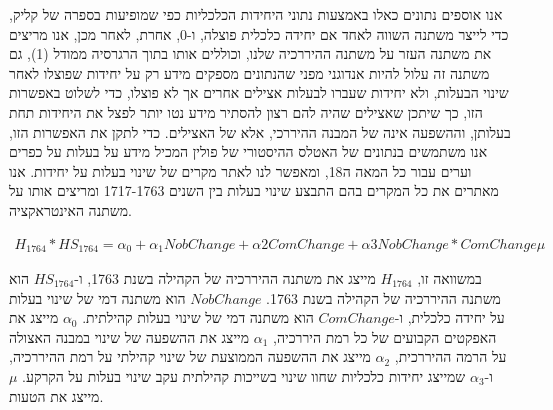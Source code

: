 אנו אוספים נתונים כאלו באמצעות נתוני היחידות הכלכליות כפי שמופיעות בספרה של קליק, כדי לייצר משתנה השווה לאחד אם יחידה כלכלית פוצלה, ו-0, אחרת, לאחר מכן, אנו מריצים את משתנה העזר על משתנה ההיררכיה שלנו, וכוללים אותו בתוך הרגרסיה ממודל (1), גם משתנה זה עלול להיות אנדוגני מפני שהנתונים מספקים מידע רק על יחידות שפוצלו לאחר שינוי הבעלות, ולא יחידות שעברו לבעלות אצילים אחרים אך לא פוצלו, כדי לשלוט באפשרות הזו, כך שיתכן שאצילים שהיה להם רצון להסתיר מידע נטו יותר לפצל את היחידות תחת בעלותן, וההשפעה אינה של המבנה ההיררכי, אלא של האצילים. כדי לתקן את האפשרות הזו, אנו משתמשים בנתונים של האטלס ההיסטורי של פולין המכיל מידע על בעלות על כפרים וערים עבור כל המאה ה18, ומאפשר לנו לאתר מקרים של שינוי בעלות על יחידות. אנו מאתרים את כל המקרים בהם התבצע שינוי בעלות בין השנים 1717-1763 ומריצים אותו על משתנה האינטראקציה.

\begin{align}
H_{1764}*HS_{1764}= \alpha_0 + \alpha_1 NobChange +\alpha2 ComChange +\alpha3 NobChange * ComChange\mu
\end{align}
	

במשוואה זו, $H_{1764}$ מייצג את משתנה ההיררכיה של הקהילה בשנת 1763, ו-$HS_{1764}$ הוא משתנה ההיררכיה של הקהילה בשנת 1763. $NobChange$ הוא משתנה דמי של שינוי בעלות על יחידה כלכלית, ו-$ComChange$ הוא משתנה דמי של שינוי בעלות קהילתית. $\alpha_0$ מייצג את האפקטים הקבועים של כל רמת היררכיה, $\alpha_1$ מייצג את ההשפעה של שינוי במבנה האצולה על הרמה ההיררכית, $\alpha_2$ מייצג את ההשפעה הממוצעת של שינוי קהילתי על רמת ההיררכיה, ו-$\alpha_3$  שמייצג יחידות כלכליות שחוו שינוי בשייכות קהילתית עקב שינוי בעלות על הקרקע. $\mu$ מייצג את הטעות.
